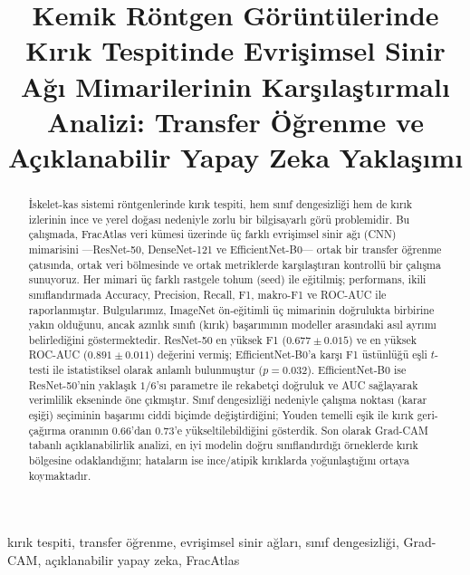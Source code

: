 \documentclass[conference]{IEEEtran}
\begin{document}
\title{Kemik Röntgen Görüntülerinde Kırık Tespitinde Evrişimsel Sinir Ağı Mimarilerinin Karşılaştırmalı Analizi: Transfer Öğrenme ve Açıklanabilir Yapay Zeka Yaklaşımı}

\author{
}

\maketitle

\begin{abstract}
İskelet-kas sistemi röntgenlerinde kırık tespiti, hem sınıf dengesizliği hem de kırık izlerinin ince ve yerel doğası nedeniyle zorlu bir bilgisayarlı görü problemidir. Bu çalışmada, FracAtlas veri kümesi üzerinde üç farklı evrişimsel sinir ağı (CNN) mimarisini ---ResNet-50, DenseNet-121 ve EfficientNet-B0--- ortak bir transfer öğrenme çatısında, ortak veri bölmesinde ve ortak metriklerde karşılaştıran kontrollü bir çalışma sunuyoruz. Her mimari üç farklı rastgele tohum (seed) ile eğitilmiş; performans, ikili sınıflandırmada Accuracy, Precision, Recall, F1, makro-F1 ve ROC-AUC ile raporlanmıştır. Bulgularımız, ImageNet ön-eğitimli üç mimarinin doğrulukta birbirine yakın olduğunu, ancak azınlık sınıfı (kırık) başarımının modeller arasındaki asıl ayrımı belirlediğini göstermektedir. ResNet-50 en yüksek F1 ($0.677 \pm 0.015$) ve en yüksek ROC-AUC ($0.891 \pm 0.011$) değerini vermiş; EfficientNet-B0'a karşı F1 üstünlüğü eşli $t$-testi ile istatistiksel olarak anlamlı bulunmuştur ($p = 0.032$). EfficientNet-B0 ise ResNet-50'nin yaklaşık $1/6$'sı parametre ile rekabetçi doğruluk ve AUC sağlayarak verimlilik ekseninde öne çıkmıştır. Sınıf dengesizliği nedeniyle çalışma noktası (karar eşiği) seçiminin başarımı ciddi biçimde değiştirdiğini; Youden temelli eşik ile kırık geri-çağırma oranının $0.66$'dan $0.73$'e yükseltilebildiğini gösterdik. Son olarak Grad-CAM tabanlı açıklanabilirlik analizi, en iyi modelin doğru sınıflandırdığı örneklerde kırık bölgesine odaklandığını; hataların ise ince/atipik kırıklarda yoğunlaştığını ortaya koymaktadır.
\end{abstract}

\begin{IEEEkeywords}
kırık tespiti, transfer öğrenme, evrişimsel sinir ağları, sınıf dengesizliği, Grad-CAM, açıklanabilir yapay zeka, FracAtlas
\end{IEEEkeywords}
\end{document}
